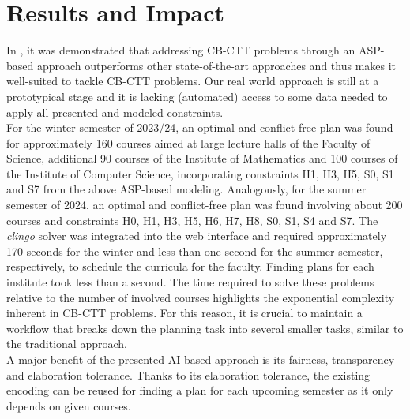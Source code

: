 \documentclass{easychair}
\newcommand{\CBCTT}{CB-CTT}
\newcommand{\ASP}{ASP}
\newcommand{\clingo}{\textit{clingo}}
\begin{document}
\section{Results and Impact}
\label{sec:impact}
  In \cite{bainkaokscsotawa18a}, it was demonstrated that addressing \CBCTT{} problems through an \ASP{}-based approach outperforms other state-of-the-art approaches and thus makes it well-suited to tackle \CBCTT{} problems. 
  Our real world approach is still at a prototypical stage and it is lacking (automated) access to some data needed to apply all presented and modeled constraints. \\
  For the winter semester of 2023/24, an optimal and conflict-free plan was found for approximately 160 courses aimed at large lecture halls of the Faculty of Science, additional 90 courses of the Institute of Mathematics and 100 courses of the Institute of Computer Science, incorporating constraints H1, H3, H5, S0, S1 and S7 from the above \ASP{}-based modeling. 
  Analogously, for the summer semester of 2024, an optimal and conflict-free plan was found involving about 200 courses and constraints H0, H1, H3, H5, H6, H7, H8, S0, S1, S4 and S7.  
  The \clingo{} solver was integrated into the web interface and required approximately  170 seconds for the winter and less than one second for the summer semester, respectively, to schedule the curricula for the faculty. 
  Finding plans for each institute took less than a second. 
  The time required to solve these problems relative to the number of involved courses highlights the exponential complexity inherent in \CBCTT{} problems. 
  For this reason, it is crucial to maintain a workflow that breaks down the planning task into several smaller tasks, similar to the traditional approach. \\
  A major benefit of the presented AI-based approach is its fairness, transparency and elaboration tolerance. 
  Thanks to its elaboration tolerance, the existing encoding can be reused for finding a plan for each upcoming semester as it only depends on given courses. 
\end{document}
